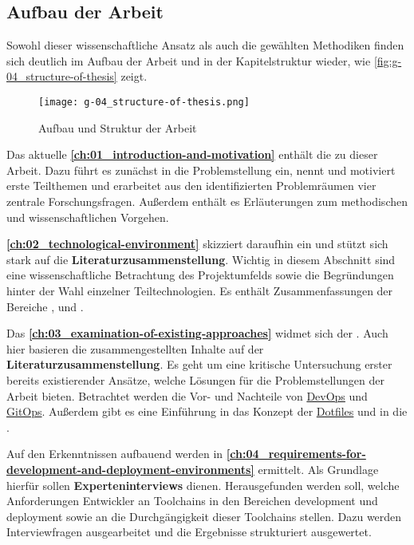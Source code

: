 \subsection{Aufbau der Arbeit}
\label{subsec:01-05-02_structure-of-the-thesis}

Sowohl dieser wissenschaftliche Ansatz als auch die gewählten Methodiken finden sich deutlich im Aufbau der Arbeit und in der Kapitelstruktur wieder, wie \autoref{fig:g-04_structure-of-thesis} zeigt.

\begin{figure}[h]
    \centering
    \texttt{[image: g-04\_structure-of-thesis.png]}
    \caption{Aufbau und Struktur der Arbeit}
    \label{fig:g-04_structure-of-thesis}
\end{figure}

Das aktuelle \textbf{\autoref{ch:01_introduction-and-motivation}} enthält die  zu dieser Arbeit. Dazu führt es zunächst in die Problemstellung ein, nennt und motiviert erste Teilthemen und erarbeitet aus den identifizierten Problemräumen vier zentrale Forschungsfragen. Außerdem enthält es Erläuterungen zum methodischen und wissenschaftlichen Vorgehen.

\pagebreak[4]

\textbf{\autoref{ch:02_technological-environment}} skizziert daraufhin ein  und stützt sich stark auf die \textbf{Literaturzusammenstellung}. Wichtig in diesem Abschnitt sind eine wissenschaftliche Betrachtung des Projektumfelds sowie die Begründungen hinter der Wahl einzelner Teiltechnologien. Es enthält Zusammenfassungen der Bereiche ,  und .

Das \textbf{\autoref{ch:03_examination-of-existing-approaches}} widmet sich der . Auch hier basieren die zusammengestellten Inhalte auf der \textbf{Literaturzusammenstellung}. Es geht um eine kritische Untersuchung erster bereits existierender Ansätze, welche Lösungen für die Problemstellungen der Arbeit bieten. Betrachtet werden die Vor- und Nachteile von \hyperref[sec:03-01_devops]{DevOps} und \hyperref[sec:03-03_gitops]{GitOps}. Außerdem gibt es eine Einführung in das Konzept der \hyperref[sec:03-04_dotfiles]{Dotfiles} und in die \hyperref[sec:03-05_concept-of-twelve-factor-app]{}.

Auf den Erkenntnissen aufbauend werden  in \textbf{\autoref{ch:04_requirements-for-development-and-deployment-environments}} ermittelt. Als Grundlage hierfür sollen \textbf{Experteninterviews} dienen. Herausgefunden werden soll, welche Anforderungen Entwickler an Toolchains in den Bereichen \Gls{development} und \Gls{deployment} sowie an die Durchgängigkeit dieser Toolchains stellen. Dazu werden Interviewfragen ausgearbeitet und die Ergebnisse strukturiert ausgewertet.

